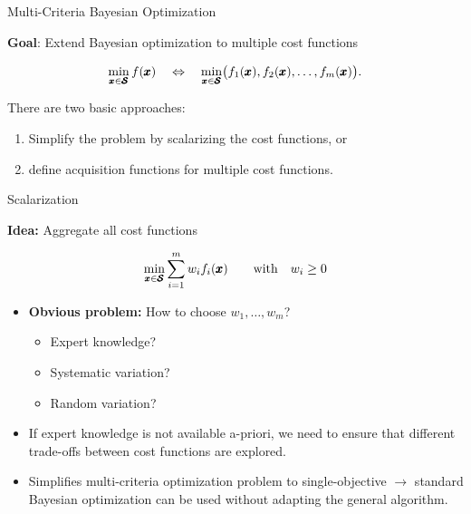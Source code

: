 \documentclass[11pt,compress,t,notes=noshow,xcolor=table]{beamer}
\begin{document}
\begin{vbframe}{Multi-Criteria Bayesian Optimization}

\textbf{Goal}: Extend Bayesian optimization to multiple cost functions

\[
\min_{\pmb{x} \in \pmb{\mathcal{S}}}  f(\pmb{x})
\quad \Leftrightarrow \quad
\min_{\pmb{x} \in \pmb{\mathcal{S}}} \bigl(f_1(\pmb{x}), f_2(\pmb{x}), \dots, f_m(\pmb{x})\bigr).
\]

\medskip

There are two basic approaches:

\begin{enumerate}
  \item Simplify the problem by scalarizing the cost functions, or
  \item define acquisition functions for multiple cost functions.
\end{enumerate}

\end{vbframe}


\begin{vbframe}{Scalarization}

\textbf{Idea:} Aggregate all cost functions

\[
\min_{\pmb{x} \in \pmb{\mathcal{S}}} \sum_{i = 1}^m w_i f_i(\pmb{x})
\quad\quad
\text{with} \quad w_i \ge 0
\]

\begin{itemize}
  \item \textbf{Obvious problem:} How to choose $w_1, \dots, w_m$?
    \begin{itemize}
      \item Expert knowledge?
      \item Systematic variation?
      \item Random variation?
    \end{itemize}
  \item If expert knowledge is not available a-priori, we need to ensure that 
        different trade-offs between cost functions are explored.
  \item Simplifies multi-criteria optimization problem to single-objective 
        $\longrightarrow$ standard Bayesian optimization can be used without 
        adapting the general algorithm.
\end{itemize}

\end{vbframe}
\end{document}

